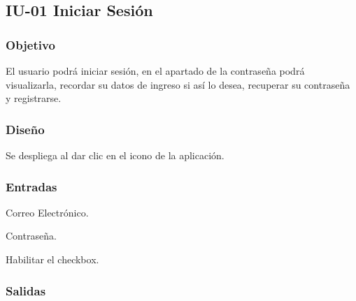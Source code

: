 \newpage
\subsection{IU-01 Iniciar Sesión}

\subsubsection{Objetivo}
	El usuario podrá iniciar sesión, en el apartado de la contraseña podrá visualizarla, recordar su datos de ingreso si así lo desea, recuperar su contraseña y registrarse.  

\subsubsection{Diseño}
	Se despliega al dar clic en el icono de la aplicación.


\subsubsection{Entradas}
\begin{Citemize} 
	\item Correo Electrónico.
	\item Contraseña.
	\item Habilitar el checkbox.
\end{Citemize}

\subsubsection{Salidas}
\begin{Citemize}
	\item {}
	\item {}
	\item {}
	\item {}
\end{Citemize}